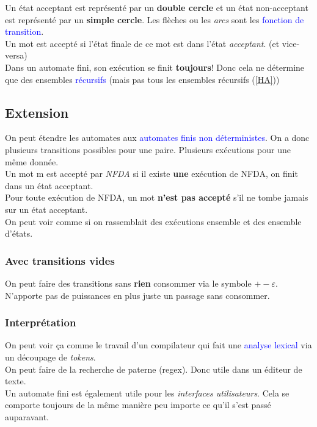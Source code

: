 \documentclass{report}
\begin{document}
Un état acceptant est représenté par un \textbf{double cercle} et un état non-acceptant est représenté par un \textbf{simple cercle}. Les flèches ou les \textit{arcs} sont les \textcolor{blue}{fonction de transition}.\\

Un mot est accepté si l'état finale de ce mot est dans l'état \textit{acceptant}. (et vice-versa)\\
Dans un automate fini, son exécution se finit \textbf{toujours}! Donc cela ne détermine que des ensembles \textcolor{blue}{récursifs} (mais pas tous les ensembles récursifs (\ref{HA}))

\subsection{Extension}
On peut étendre les automates aux \textcolor{blue}{automates finis non déterministes}. On a donc plusieurs transitions possibles pour une paire. Plusieurs exécutions pour une même donnée.\\
Un mot m est accepté par \textit{NFDA} si il existe \textbf{une} exécution de NFDA, on finit dans un état acceptant.\\
Pour toute exécution de NFDA, un mot \textbf{n'est pas accepté} s'il ne tombe jamais sur un état acceptant.\\

On peut voir comme si on rassemblait des exécutions ensemble et des ensemble d'états.

\subsubsection{Avec transitions vides}
On peut faire des transitions sans \textbf{rien} consommer via le symbole $+-\varepsilon$. N'apporte pas de puissances en plus juste un passage sans consommer.

\subsubsection{Interprétation}
On peut voir ça comme le travail d'un compilateur qui fait une \textcolor{blue}{analyse lexical} via un découpage de \textit{tokens}.\\
On peut faire de la recherche de paterne (regex). Donc utile dans un éditeur de texte.\\
Un automate fini est également utile pour les \textit{interfaces utilisateurs}. Cela se comporte toujours de la même manière peu importe ce qu'il s'est passé auparavant.
\end{document}
